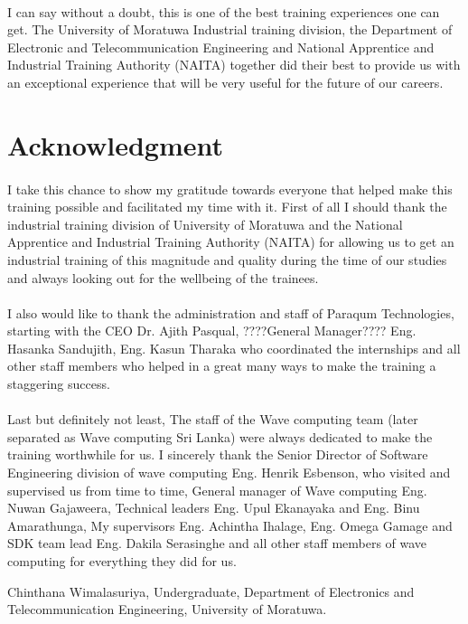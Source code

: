 \paragraph{}
I can say without a doubt, this is one of the best training experiences one can get. The University of Moratuwa Industrial training division, the Department of Electronic and Telecommunication Engineering and National Apprentice and Industrial Training Authority (NAITA) together did their best to provide us with an exceptional experience that will be very useful for the future of our careers.

\newpage
\section*{Acknowledgment}

\paragraph{}
I take this chance to show my gratitude towards everyone that helped make this training possible and facilitated my time with it. First of all I should thank the industrial training division of University of Moratuwa and the National Apprentice and Industrial Training Authority (NAITA) for allowing us to get an industrial training of this magnitude and quality during the time of our studies and always looking out for the wellbeing of the trainees.

\paragraph{}
I also would like to thank the administration and staff of Paraqum Technologies, starting with the CEO Dr. Ajith Pasqual, ????General Manager???? Eng. Hasanka Sandujith, Eng. Kasun Tharaka who coordinated the internships and all other staff members who helped in a great many ways to make the training a staggering success. 

\paragraph{}
Last but definitely not least, The staff of the Wave computing team (later separated as Wave computing Sri Lanka) were always dedicated to make the training worthwhile for us. I sincerely thank the Senior Director of Software Engineering division of wave computing Eng. Henrik Esbenson, who visited and supervised us from time to time, General manager of Wave computing Eng. Nuwan Gajaweera, Technical leaders Eng. Upul Ekanayaka and Eng. Binu Amarathunga, My supervisors Eng. Achintha Ihalage, Eng. Omega Gamage and SDK team lead Eng. Dakila Serasinghe and all other staff members of wave computing for everything they did for us.

\vspace*{3cm}

\noindent Chinthana Wimalasuriya,\newline
Undergraduate,\newline
Department of Electronics and Telecommunication Engineering,\newline
University of Moratuwa.